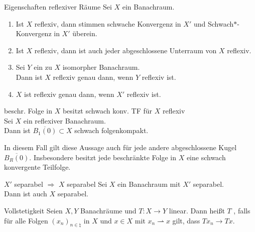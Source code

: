 \begin{Lemma}{Eigenschaften reflexiver Räume}
    Sei $X$ ein Banachraum.
    \begin{enumerate}
        \item
        Ist $X$ reflexiv, dann stimmen schwache Konvergenz in $X'$ und
        Schwach$\ast$-Konvergenz in $X'$ überein.
        
        \item
        Ist $X$ reflexiv, dann ist auch jeder abgeschlossene Unterraum von $X$ reflexiv.
        
        \item
        Sei $Y$ ein zu $X$ isomorpher Banachraum.\\
        Dann ist $X$ reflexiv genau dann, wenn $Y$ reflexiv ist.
        
        \item
        $X$ ist reflexiv genau dann, wenn $X'$ reflexiv ist.
    \end{enumerate}
\end{Lemma}

\linie

\begin{Satz}{beschr. Folge in $X$ besitzt schwach konv. TF für $X$ reflexiv}\\
    Sei $X$ ein reflexiver Banachraum.\\
    Dann ist $\overline{B_1(0)} \subset X$ schwach folgenkompakt.
\end{Satz}

\begin{Bem}
    In diesem Fall gilt diese Aussage auch für jede andere abgeschlossene Kugel
    $\overline{B_R(0)}$.
    Insbesondere besitzt jede beschränkte Folge in $X$ eine schwach konvergente Teilfolge.
\end{Bem}

\begin{Lemma}{$X'$ separabel $\Rightarrow$ $X$ separabel}
    Sei $X$ ein Banachraum mit $X'$ separabel.\\
    Dann ist auch $X$ separabel.
\end{Lemma}

\linie

\begin{Def}{Vollstetigkeit}
    Seien $X, Y$ Banachräume und $T\colon X \rightarrow Y$ linear.
    Dann heißt $T$ , falls
    für alle Folgen $(x_n)_{n \in \natural}$ in $X$ und $x \in X$ mit $x_n \rightharpoonup x$
    gilt, dass $Tx_n \to Tx$.
\end{Def}

